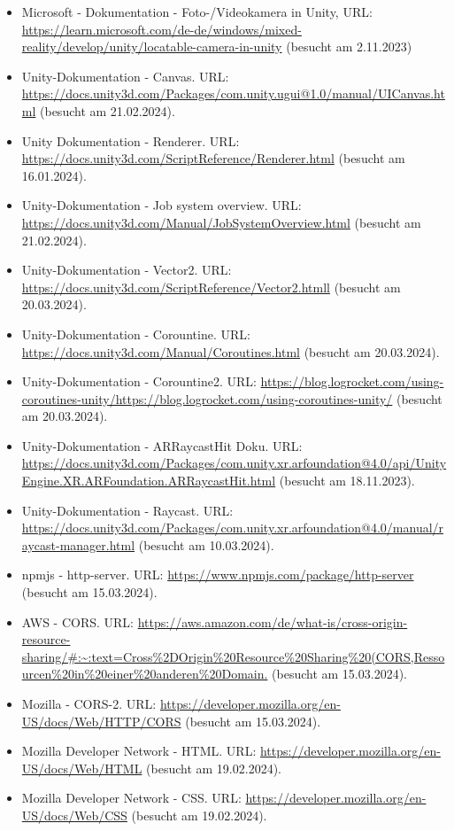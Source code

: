 \begin{itemize}
    \item Microsoft - Dokumentation - Foto-/Videokamera in Unity, URL:  \url{https://learn.microsoft.com/de-de/windows/mixed-reality/develop/unity/locatable-camera-in-unity} (besucht am 2.11.2023)
    \item Unity-Dokumentation -  Canvas. URL: \url{https://docs.unity3d.com/Packages/com.unity.ugui@1.0/manual/UICanvas.html} (besucht am 21.02.2024).
    \item Unity Dokumentation - Renderer. URL: \url{https://docs.unity3d.com/ScriptReference/Renderer.html} (besucht am 16.01.2024).
    \item Unity-Dokumentation - Job system overview. URL: \url{https://docs.unity3d.com/Manual/JobSystemOverview.html} (besucht am 21.02.2024).
    \item Unity-Dokumentation - Vector2. URL: \url{https://docs.unity3d.com/ScriptReference/Vector2.htmll} (besucht am 20.03.2024).
    \item Unity-Dokumentation - Corountine. URL: \url{https://docs.unity3d.com/Manual/Coroutines.html} (besucht am 20.03.2024).
    \item Unity-Dokumentation - Corountine2. URL: \url{https://blog.logrocket.com/using-coroutines-unity/https://blog.logrocket.com/using-coroutines-unity/} (besucht am 20.03.2024).
    \item Unity-Dokumentation - ARRaycastHit Doku. URL:  \url{https://docs.unity3d.com/Packages/com.unity.xr.arfoundation@4.0/api/UnityEngine.XR.ARFoundation.ARRaycastHit.html} (besucht am 18.11.2023).
    \item Unity-Dokumentation - Raycast. URL: \url{https://docs.unity3d.com/Packages/com.unity.xr.arfoundation@4.0/manual/raycast-manager.html} (besucht am 10.03.2024).
    \item npmjs - http-server. URL: \url{https://www.npmjs.com/package/http-server} (besucht am 15.03.2024).
    \item AWS - CORS. URL: \url{https://aws.amazon.com/de/what-is/cross-origin-resource-sharing/#:~:text=Cross%2DOrigin%20Resource%20Sharing%20(CORS,Ressourcen%20in%20einer%20anderen%20Domain.} (besucht am 15.03.2024).
    \item Mozilla - CORS-2. URL: \url{https://developer.mozilla.org/en-US/docs/Web/HTTP/CORS} (besucht am 15.03.2024).
    \item Mozilla Developer Network - HTML. URL: \url{https://developer.mozilla.org/en-US/docs/Web/HTML} (besucht am 19.02.2024).
    \item Mozilla Developer Network - CSS. URL: \url{https://developer.mozilla.org/en-US/docs/Web/CSS} (besucht am 19.02.2024).

\end{itemize}
